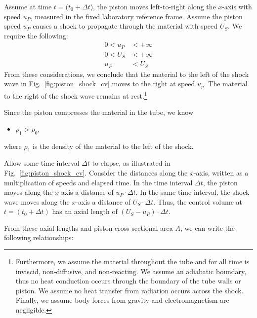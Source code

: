 Assume at time $t=(t_0 + \Delta t$), the piston moves left-to-right
along the $x$-axis with speed $u_P$, measured in the fixed 
laboratory reference frame.  
Assume the piston speed $u_P$ causes a shock to propagate through
the material with speed $U_S$.  We require the following:
\begin{align}
  0 < u_P &< +\infty \label{eq:up} \\
  0 < U_S &< +\infty \label{eq:us} \\
  u_P &< U_S \label{eq:upltus}
\end{align}
From these considerations, we conclude that the material to the left of the
shock wave in Fig.~\ref{fig:piston_shock_cv} moves to the right at speed
$u_p$.  The material to the right of the shock wave remains at 
rest.\footnote{Furthermore, we assume the material throughout the tube and
for all time is inviscid, non-diffusive, and non-reacting.  We assume 
an adiabatic boundary, thus no
heat conduction occurs through the boundary of the tube walls or piston.
We assume no heat transfer from radiation occurs across the shock.  Finally, 
we assume body forces from gravity and electromagnetism are negligible.}

Since the piston compresses the material in the tube, we know
\begin{itemize}
\item $\rho_1 > \rho_0$,
\end{itemize}
where $\rho_1$ is the density of the material to the left of the shock.

Allow some time interval $\Delta t$ to elapse, as illustrated 
in Fig.~\ref{fig:piston_shock_cv}.  Consider the distances along the
$x$-axis, written as a multiplication of speeds and elapsed time.  
In the time interval $\Delta t$, the piston moves along the $x$-axis
a distance of $u_P \cdot \Delta t$.  
In the same time interval, the shock wave moves along the $x$-axis
a distance of $U_S \cdot \Delta t$.  Thus, the control volume at 
$t=(t_0 + \Delta t)$ has an axial length of $(U_S - u_P) \cdot \Delta t$.

From these axial lengths and piston cross-sectional area $A$, we can write
the following relationships:

